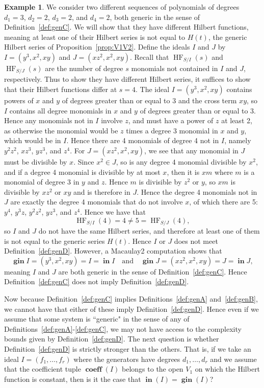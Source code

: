 \documentclass[11pt]{article}
\DeclareMathOperator{\Init}{\mathbf{in}}
\DeclareMathOperator{\HF}{HF}
\DeclareMathOperator{\gin}{\mathbf{gin}}
\DeclareMathOperator{\coeff}{\textbf{coeff}}
\theoremstyle{definition}
\newtheorem{example}{Example}
\begin{document}
\begin{example}
	We consider two different sequences of polynomials of degrees $d_1 = 3$, $d_2 = 2$, $d_3 = 2$, and $d_4 = 2$, both generic in the sense of Definition~\ref{def:genC}. We will show that they have different Hilbert functions, meaning at least one of their Hilbert series is not equal to $H(t)$, the generic Hilbert series of Proposition~\ref{prop:V1V2}. Define the ideals $I$ and $J$ by $I = (y^3, x^2, xy)$ and $J = (xz^2, x^2, xy)$. Recall that $\HF_{S/I}(s)$ and $\HF_{S/J}(s)$ are the number of degree $s$ monomials not contained in $I$ and $J$, respectively. Thus to show they have different Hilbert series, it suffices to show that their Hilbert functions differ at $s = 4$. The ideal $I = (y^3, x^2, xy)$ contains powers of $x$ and $y$ of degrees greater than or equal to 3 and the cross term $xy$, so $I$ contains all degree monomials in $x$ and $y$ of degrees greater than or equal to 3. Hence any monomials not in $I$ involve $z$, and must have a power of $z$ at least 2, as otherwise the monomial would be $z$ times a degree 3 monomial in $x$ and $y$, which would be in $I$. Hence there are 4 monomials of degree 4 not in $I$, namely $y^2 z^2$, $xz^3$, $yz^3$, and $z^4$. For $J = (xz^2, x^2, xy)$, we see that any monomial in $J$ must be divisible by $x$. Since $x^2 \in J$, so is any degree 4 monomial divisible by $x^2$, and if a degree 4 monomial is divisible by at most $x$, then it is $xm$ where $m$ is a monomial of degree 3 in $y$ and $z$. Hence $m$ is divisible by $z^2$ or $y$, so $xm$ is divisible by $xz^2$ or $xy$ and is therefore in $J$. Hence the degree 4 monomials not in $J$ are exactly the degree 4 monomials that do not involve $x$, of which there are 5: $y^4$, $y^3z$, $y^2z^2$, $yz^3$, and $z^4$. Hence we have that \[ \HF_{S/I}(4) = 4 \neq 5 = \HF_{S/J}(4), \] so $I$ and $J$ do not have the same Hilbert series, and therefore at least one of them is not equal to the generic series $H(t)$. Hence $I$ or $J$ does not meet Definition~\ref{def:genD}. However, a Macaulay2 computation shows that \[ \gin I = (y^3, x^2, xy) = I = \Init I \quad \text{and} \quad \gin J = (xz^2, x^2, xy) = J = \Init J, \] meaning $I$ and $J$ are both generic in the sense of Definition~\ref{def:genC}. Hence Definition~\ref{def:genC} does not imply Definition~\ref{def:genD}.
\end{example}


Now because Definition~\ref{def:genC} implies Definitions~\ref{def:genA} and~\ref{def:genB}, we cannot have that either of these imply Definition~\ref{def:genD}. Hence even if we assume that some system is ``generic" in the sense of any of Definitions~\ref{def:genA}-\ref{def:genC}, we may not have access to the complexity bounds given by Definition~\ref{def:genD}. The next question is whether Definition~\ref{def:genD} is strictly stronger than the others. That is, if we take an ideal $I = (f_1, \dots, f_r)$ where the generators have degrees $d_1, \dots, d_r$ and we assume that the coefficient tuple $\coeff(I)$ belongs to the open $V_1$ on which the Hilbert function is constant, then is it the case that $\Init(I) = \gin(I)$? 
\end{document}
